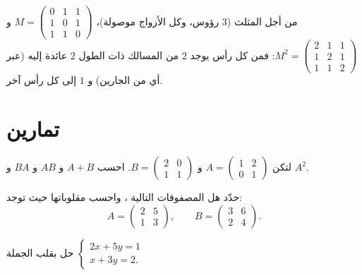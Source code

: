 \begin{example}
من أجل  المثلث ($3$ رؤوس، وكل الأزواج موصولة)،
$M = \begin{pmatrix} 0&1&1\\ 1&0&1\\ 1&1&0\end{pmatrix}$ و
$M^2 = \begin{pmatrix} 2&1&1\\ 1&2&1\\ 1&1&2\end{pmatrix}$: فمن كل رأس
يوجد $2$ من المسالك ذات الطول $2$ عائدة إليه (عبر أي من الجارين) و
$1$ إلى كل رأس آخر.
\end{example}

\section{تمارين}

\begin{exercise}[$\star$]\label{exo:g12:matrix:1}
لتكن $A = \begin{pmatrix} 1 & 2\\ 0 & 1 \end{pmatrix}$ و
$B = \begin{pmatrix} 2 & 0\\ 1 & 1 \end{pmatrix}$. احسب $A + B$ و $AB$ و
$BA$ و $A^2$.
\end{exercise}

\begin{exercise}[$\star$]\label{exo:g12:matrix:2}
حدّد هل المصفوفات التالية ، واحسب
مقلوباتها حيث توجد:
\[
A = \begin{pmatrix} 2 & 5\\ 1 & 3\end{pmatrix}, \qquad
B = \begin{pmatrix} 3 & 6\\ 2 & 4\end{pmatrix}.
\]
\end{exercise}

\begin{exercise}[$\star$]\label{exo:g12:matrix:3}
حل بقلب  الجملة
$\begin{cases} 2x + 5y = 1\\ x + 3y = 2 . \end{cases}$
\end{exercise}

